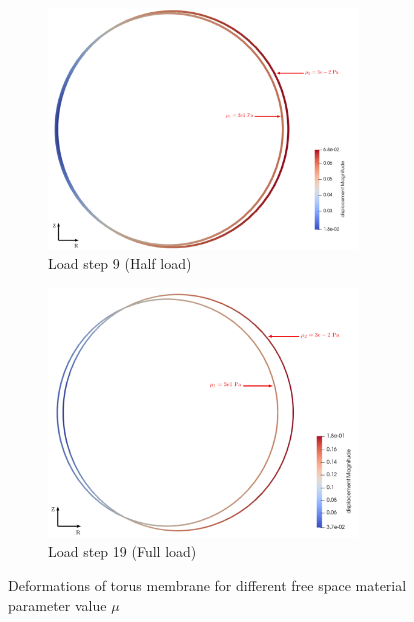 \documentclass[11pt,a4paper,final]{article}
\begin{document}
\begin{figure}[h!]
\centering 
\begin{subfigure}[b]{0.49\textwidth}
\centering
\includegraphics[width=0.9\textwidth]{mue_study_1e3_vs_1e6_half_load.pdf}
\caption{Load step 9 (Half load)}
\label{fig:1.12.1}
\end{subfigure}
\begin{subfigure}[b]{0.49\textwidth}
\centering
\includegraphics[width=0.9\textwidth]{mue_study_1e3_vs_1e6_full_load.pdf}
\caption{Load step 19 (Full load)}
\label{fig:1.12.2}
\end{subfigure}
\caption{Deformations of torus membrane for different free space material parameter value $\mu$}
\label{fig:1.12}
\end{figure}
\end{document}

